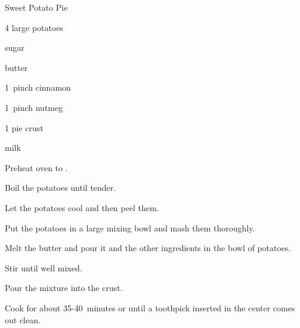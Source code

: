 \begin{recipe}{Sweet Potato Pie \UNTESTED}{}{}

\begin{ingredients}
\item 4 large potatoes
\item {} sugar
\item \C{\half} butter
\item 1~pinch cinnamon
\item 1~pinch nutmeg
\item 1 pie crust
\item \C{\half} milk
\end{ingredients}

\begin{directions}
\item Preheat oven to .
\item Boil the potatoes until tender.
\item Let the potatoes cool and then peel them.
\item Put the potatoes in a large mixing bowl and mash them thoroughly.
\item Melt the butter and pour it and the other ingredients in the bowl of potatoes.
\item Stir until well mixed. 
\item Pour the mixture into the crust.
\item Cook for about 35-40~minutes or until a toothpick inserted in the center comes out clean.
\end{directions}

\end{recipe}
